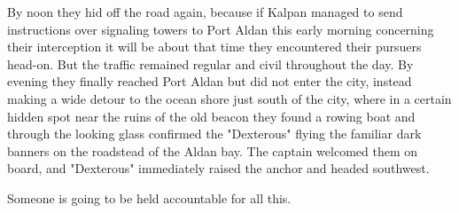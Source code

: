 By noon they hid off the road again, because if Kalpan managed to send instructions over signaling towers to Port Aldan this early morning concerning their interception it will be about that time they encountered their pursuers head-on. But the traffic remained regular and civil throughout the day. By evening they finally reached Port Aldan but did not enter the city, instead making a wide detour to the ocean shore just south of the city, where in a certain hidden spot near the ruins of the old beacon they found a rowing boat and through the looking glass confirmed the "Dexterous" flying the familiar dark banners on the roadstead of the Aldan bay. The captain welcomed them on board, and "Dexterous" immediately raised the anchor and headed southwest.

Someone is going to be held accountable for all this.
